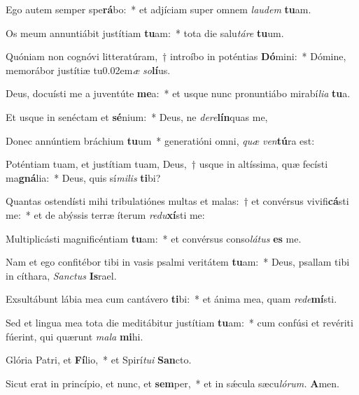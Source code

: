\item Ego autem semper spe\textbf{rá}bo:~* et adjíciam super omnem \textit{laudem} \textbf{tu}am.
\item Os meum annuntiábit justítiam \textbf{tu}am:~* tota die salu\hspace{0.03em}\textit{táre} \textbf{tu}um.
\item Quóniam non cognóvi litteratúram,~† introíbo in poténtias \textbf{Dó}mini:~* Dómine, memorábor justítiæ tu\kern 0.02em\textit{æ} \textit{so}\textbf{lí}us.
\item Deus, docuísti me a juventúte \textbf{me}a:~* et usque nunc pronuntiábo mirabí\hspace{0.03em}\textit{lia} \textbf{tu}a.
\item Et usque in senéctam et \textbf{sé}nium:~* Deus, ne \textit{dere}\textbf{lín}quas me,
\item Donec annúntiem bráchium \textbf{tu}um~* generatióni omni, \textit{quæ} \textit{ven}\textbf{tú}ra est:
\item Poténtiam tuam, et justítiam tuam, Deus,~† usque in altíssima, quæ fecísti ma\textbf{gná}lia:~* Deus, quis sí\textit{milis} \textbf{ti}bi?
\item Quantas ostendísti mihi tribulatiónes multas et malas:~† et convérsus vivifi\textbf{cá}sti me:~* et de abýssis terræ íterum \textit{redu}\textbf{xí}sti me:
\item Multiplicásti magnificéntiam \textbf{tu}am:~* et convérsus conso\textit{látus} \textbf{es} me.
\item Nam et ego confitébor tibi in vasis psalmi veritátem \textbf{tu}am:~* Deus, psallam tibi in cíthara, \textit{San\-ctus} \textbf{Is}rael.
\item Exsultábunt lábia mea cum cantávero \textbf{ti}bi:~* et ánima mea, quam \textit{rede}\textbf{mí}sti.
\item Sed et lingua mea tota die meditábitur ju\-stítiam \textbf{tu}am:~* cum confúsi et revériti fúerint, qui quærunt \textit{mala} \textbf{mi}hi.
\item Glória Patri, et \textbf{Fí}lio,~* et Spirí\hspace{0.03em}\textit{tui} \textbf{San}cto.
\item Sicut erat in princípio, et nunc, et \textbf{sem}per,~* et in sǽcula sæcu\hspace{0.03em}\textit{lórum.} \textbf{A}men.
